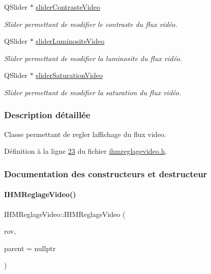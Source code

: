 \begin{DoxyCompactItemize}
Q\+Slider $\ast$ \hyperlink{class_i_h_m_reglage_video_a69917b4179132a63efe6c3fb63ba666a}{slider\+Contraste\+Video}
\begin{DoxyCompactList}\small\item\em Slider permettant de modifier le contraste du flux vidéo. \end{DoxyCompactList}\item 
Q\+Slider $\ast$ \hyperlink{class_i_h_m_reglage_video_a333b7f1b3239abd5823e0b0f2857716b}{slider\+Luminosite\+Video}
\begin{DoxyCompactList}\small\item\em Slider permettant de modifier la luminosite du flux vidéo. \end{DoxyCompactList}\item 
Q\+Slider $\ast$ \hyperlink{class_i_h_m_reglage_video_aba60de0eccec35f165101b10c0cd33df}{slider\+Saturation\+Video}
\begin{DoxyCompactList}\small\item\em Slider permettant de modifier la saturation du flux vidéo. \end{DoxyCompactList}\end{DoxyCompactItemize}


\subsubsection{Description détaillée}
Classe permettant de regler l\textquotesingle{}affichage du flux video. 

Définition à la ligne \hyperlink{ihmreglagevideo_8h_source_l00023}{23} du fichier \hyperlink{ihmreglagevideo_8h_source}{ihmreglagevideo.\+h}.



\subsubsection{Documentation des constructeurs et destructeur}
\mbox{\label{class_i_h_m_reglage_video_aa057ded6ad29a2d7fd117a8e9336c3ad}} 
\paragraph{\texorpdfstring{I\+H\+M\+Reglage\+Video()}{IHMReglageVideo()}}
{\footnotesize\ttfamily I\+H\+M\+Reglage\+Video\+::\+I\+H\+M\+Reglage\+Video (\begin{DoxyParamCaption}\item[{\hyperlink{class_rov}{Rov} $\ast$}]{rov,  }\item[{\hyperlink{class_q_widget}{Q\+Widget} $\ast$}]{parent = {\ttfamily nullptr} }\end{DoxyParamCaption})}



